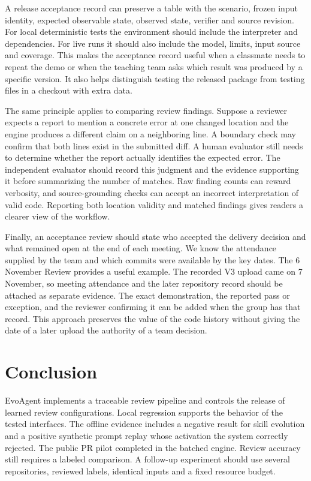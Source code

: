 \documentclass[journal,compsoc]{IEEEtran}
\begin{document}
A release acceptance record can preserve a table with the scenario, frozen input identity, expected observable state, observed state, verifier and source revision. For local deterministic tests the environment should include the interpreter and dependencies. For live runs it should also include the model, limits, input source and coverage. This makes the acceptance record useful when a classmate needs to repeat the demo or when the teaching team asks which result was produced by a specific version. It also helps distinguish testing the released package from testing files in a checkout with extra data.

The same principle applies to comparing review findings. Suppose a reviewer expects a report to mention a concrete error at one changed location and the engine produces a different claim on a neighboring line. A boundary check may confirm that both lines exist in the submitted diff. A human evaluator still needs to determine whether the report actually identifies the expected error. The independent evaluator should record this judgment and the evidence supporting it before summarizing the number of matches. Raw finding counts can reward verbosity, and source-grounding checks can accept an incorrect interpretation of valid code. Reporting both location validity and matched findings gives readers a clearer view of the workflow.

Finally, an acceptance review should state who accepted the delivery decision and what remained open at the end of each meeting. We know the attendance supplied by the team and which commits were available by the key dates. The 6 November Review provides a useful example. The recorded V3 upload came on 7 November, so meeting attendance and the later repository record should be attached as separate evidence. The exact demonstration, the reported pass or exception, and the reviewer confirming it can be added when the group has that record. This approach preserves the value of the code history without giving the date of a later upload the authority of a team decision.

\section{Conclusion}
EvoAgent implements a traceable review pipeline and controls the release of learned review configurations. Local regression supports the behavior of the tested interfaces. The offline evidence includes a negative result for skill evolution and a positive synthetic prompt replay whose activation the system correctly rejected. The public PR pilot completed in the batched engine. Review accuracy still requires a labeled comparison. A follow-up experiment should use several repositories, reviewed labels, identical inputs and a fixed resource budget.
\end{document}
